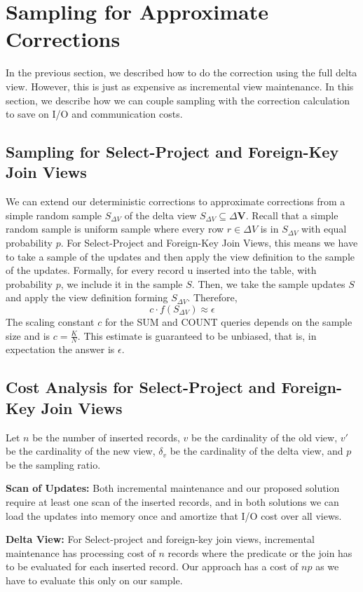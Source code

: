 \section{Sampling for Approximate Corrections}
In the previous section, we described how to do the correction using the full delta view.
However, this is just as expensive as incremental view maintenance.
In this section, we describe how we can couple sampling with the correction calculation to
save on I/O and communication costs. 

\subsection{Sampling for Select-Project and Foreign-Key Join Views}
We can extend our deterministic corrections to approximate corrections from a 
simple random sample $S_{\Delta V}$ of the delta view $S_{\Delta V}\subseteq\Delta\textbf{V}$. 
Recall that a simple random sample is uniform sample where every row $r\in\Delta V$
is in $S_{\Delta V}$ with equal probability $p$. For Select-Project
and Foreign-Key Join Views, this means we have to take a sample of
the updates and then apply the view definition to the sample of the
updates. Formally, for every record u inserted into the table, with
probability $p$, we include it in the sample $S$. Then, we take
the sample updates $S$ and apply the view definition forming $S_{\Delta V}$.
Therefore,
\[
c\cdot f(S_{\Delta V})\approx\epsilon
\]
The scaling constant $c$ for the SUM and COUNT queries
depends on the sample size and is $c = \frac{K}{N}$.
This estimate is guaranteed to be unbiased, that is, in expectation the answer is $\epsilon$.

\subsection{Cost Analysis for Select-Project and Foreign-Key Join Views}
Let $n$ be the number of inserted records, $v$ be the cardinality of the old view, $v'$ be the cardinality of the new view, $\delta_v$ be the cardinality of the delta view, and $p$ be the sampling ratio.  

\textbf{Scan of Updates: }
Both incremental maintenance and our proposed solution require at least one scan of the inserted records, and in both solutions we can
load the updates into memory once and amortize that I/O cost over all views. 

\textbf{Delta View: } For Select-project and foreign-key join views, incremental maintenance has processing cost of $n$ records where the predicate or the join has to be evaluated for each inserted record. Our approach has a cost of $np$ as we have to evaluate this only on our sample. 

